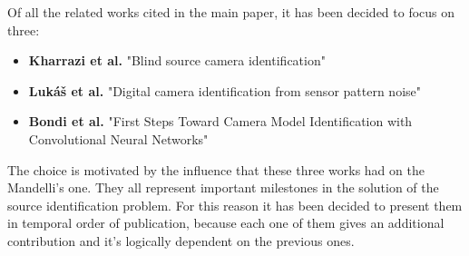 Of all the related works cited in the main paper, it has been decided to focus on three:
\begin{itemize}
    \item \textbf{Kharrazi et al.} "Blind source camera identification"\cite{Kharrazi}
    \item \textbf{Lukáš et al.} "Digital camera identification from sensor pattern noise"\cite{Lukas}
    \item \textbf{Bondi et al.} "First Steps Toward Camera Model Identification with Convolutional Neural Networks"\cite{Bondi}
\end{itemize}
The choice is motivated by the influence that these three works had on the Mandelli's one.
They all represent important milestones in the solution of the source identification problem.
For this reason it has been decided to present them in temporal order of publication, because each one of them gives an additional contribution and it's logically dependent on the previous ones.

